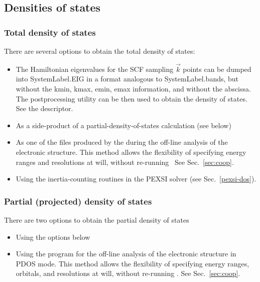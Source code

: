 \subsection{Densities of states}

\subsubsection{Total density of states}
There are several options to obtain the
total density of states:
\begin{itemize}
\item The Hamiltonian eigenvalues for the SCF sampling $\vec k$ points can be
dumped into SystemLabel.EIG in a format analogous to SystemLabel.bands,
but without the kmin, kmax, emin, emax information, and without
the abscissa. The 
postprocessing utility can be then used to obtain the density of
states.
See the  descriptor.
%
\item As a side-product of a partial-density-of-states calculation
  (see below)
\item As one of the files produced by the  during
  the off-line analysis of the electronic structure. This method
  allows the flexibility of specifying energy ranges and resolutions
  at will, without re-running \siesta\ See Sec.~\ref{sec:coop}.
\item Using the inertia-counting routines in the PEXSI solver (see Sec.~\ref{pexsi-dos}).
\end{itemize}

\subsubsection{Partial (projected) density of states}

There are two options to obtain the partial density of states
\begin{itemize}
\item Using the options below
\item Using the  program for the off-line analysis of
  the electronic structure in PDOS mode. This method allows the
  flexibility of specifying energy ranges, orbitals, and resolutions
  at will, without re-running \siesta. See Sec.~\ref{sec:coop}.
\end{itemize}

